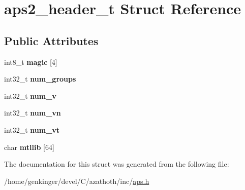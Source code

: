 \hypertarget{structaps2__header__t}{}\section{aps2\+\_\+header\+\_\+t Struct Reference}
\label{structaps2__header__t}
\subsection*{Public Attributes}
\begin{DoxyCompactItemize}
\item 
\mbox{\label{structaps2__header__t_a61a1451c4475fc84b99c524090c83eec}} 
int8\+\_\+t {\bfseries magic} \mbox{[}4\mbox{]}
\item 
\mbox{\label{structaps2__header__t_aaddd3d8571bfcb22aad26ed189d1a55c}} 
int32\+\_\+t {\bfseries num\+\_\+groups}
\item 
\mbox{\label{structaps2__header__t_a5aa82a576ed51086a49e760190b49715}} 
int32\+\_\+t {\bfseries num\+\_\+v}
\item 
\mbox{\label{structaps2__header__t_a963995be6a9449a1db1f31b059e52b5c}} 
int32\+\_\+t {\bfseries num\+\_\+vn}
\item 
\mbox{\label{structaps2__header__t_ab56b5ae2c29973607e1a3daff1cc7962}} 
int32\+\_\+t {\bfseries num\+\_\+vt}
\item 
\mbox{\label{structaps2__header__t_a8ae234b72f409fff11c87deac68f8713}} 
char {\bfseries mtllib} \mbox{[}64\mbox{]}
\end{DoxyCompactItemize}


The documentation for this struct was generated from the following file\+:\begin{DoxyCompactItemize}
\item 
/home/genkinger/devel/\+C/azathoth/inc/\mbox{\hyperlink{aps_8h}{aps.\+h}}\end{DoxyCompactItemize}
